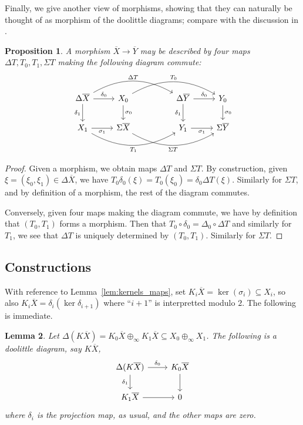 \documentclass[a4paper,11pt]{article}
\theoremstyle{plain}
\newtheorem{proposition}{Proposition}[section]
\newtheorem{lemma}[proposition]{Lemma}
\theoremstyle{remark}
\begin{document}
Finally, we give another view of morphisms, showing that they can naturally be thought of as morphism of the doolittle diagrams; compare with the discussion in \cite[Section~IV.1]{KP_InterpolationFunctorsDuality}.

\begin{proposition}\label{prop:morphisms_of_diagrams}
A morphism $\overline X \to \overline Y$ may be described by four maps $\Delta T, T_0, T_1, \Sigma T$ making the following diagram commute:
\[ \begin{tikzcd}
\Delta\overline X \arrow[r, "\delta_0"] \arrow[d, "\delta_1"']
\arrow[rrr, bend left, "\Delta T"]
& X_0 \arrow[d, "\sigma_0"] \arrow[rrr, bend left, "T_0"]
& &
\Delta\overline Y \arrow[r, "\delta_0"] \arrow[d, "\delta_1"'] & Y_0 \arrow[d, "\sigma_0"]
\\
X_1 \arrow[r, "\sigma_1"'] \arrow[rrr, bend right, "T_1"']
& \Sigma\overline X \arrow[rrr, bend right, "\Sigma T"']
& &
Y_1 \arrow[r, "\sigma_1"'] & \Sigma\overline Y
\end{tikzcd}
\]
\end{proposition}
\begin{proof}
Given a morphism, we obtain maps $\Delta T$ and $\Sigma T$.  By construction, given $\xi = (\xi_0,\xi_1) \in \Delta\overline X$, we have $T_0 \delta_0(\xi) = T_0(\xi_0) = \delta_0 \Delta T(\xi)$.  Similarly for $\Sigma T$, and by definition of a morphism, the rest of the diagram commutes.

Conversely, given four maps making the diagram commute, we have by definition that $(T_0,T_1)$ forms a morphism.  Then that $T_0 \circ \delta_0 = \Delta_0 \circ \Delta T$ and similarly for $T_1$, we see that $\Delta T$ is uniquely determined by $(T_0,T_1)$.  Similarly for $\Sigma T$.
\end{proof}


\subsection{Constructions}

With reference to Lemma~\ref{lem:kernels_maps}, set $K_i\overline X = \ker(\sigma_i) \subseteq X_i$, so also $K_i\overline X = \delta_i(\ker \delta_{i+1})$ where ``$i+1$'' is interpretted modulo $2$.  The following is immediate.

\begin{lemma}\label{lem:defn_K}
Let $\Delta (K\overline X) = K_0\overline X \oplus_\infty K_1\overline X \subseteq X_0\oplus_\infty X_1$.  The following is a doolittle diagram, say $K\overline X$,
\[ \begin{tikzcd} \Delta(K\overline X) \arrow[r, "\delta_0"] \arrow[d, "\delta_1"'] & K_0\overline X \arrow[d] \\
K_1\overline X \arrow[r] & 0
\end{tikzcd} \]
where $\delta_i$ is the projection map, as usual, and the other maps are zero.
\end{lemma}
\end{document}

